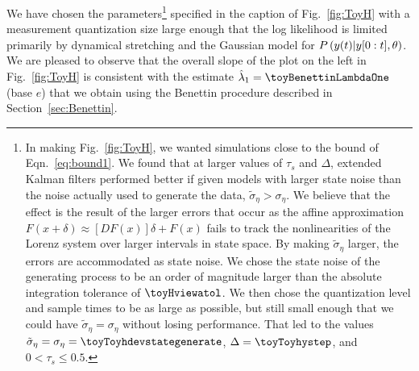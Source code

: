 We have chosen the parameters\footnote{ In making Fig.~\ref{fig:ToyH},
  we wanted simulations close to the bound of Eqn.~\eqref{eq:bound1}.
  We found that at larger values of $\tau_s$ and $\Delta$, extended
  Kalman filters performed better if given models with larger state
  noise than the noise actually used to generate the data, \ie
  $\tilde \sigma_\eta > \sigma_\eta$.  We believe that the effect is
  the result of the larger errors that occur as the affine
  approximation $F(x+\delta) \approx [DF(x)] \delta + F(x)$ fails to
  track the nonlinearities of the Lorenz system over larger intervals
  in state space.  By making $\tilde \sigma_\eta$ larger, the errors
  are accommodated as state noise.  We chose the state noise of the
  generating process to be an order of magnitude larger than the
  absolute integration tolerance of $\toyHviewatol$.  We then chose
  the quantization level and sample times to be as large as possible,
  but still small enough that we could have
  $\tilde \sigma_\eta = \sigma_\eta$ without losing performance.  That
  led to the values
  $\tilde \sigma_\eta = \sigma_\eta = \toyToyhdevstategenerate$,
  $\Delta = \toyToyhystep$, and $0 < \tau_s \leq 0.5$.} specified in
the caption of Fig.~\ref{fig:ToyH} with a measurement quantization
size large enough that the log likelihood is limited primarily by
dynamical stretching and the Gaussian model for
$ P \left({y}{(t)}|y[0:t], \theta \right)$.  We are pleased
to observe that the overall slope of the plot on the left in
Fig.~\ref{fig:ToyH} is consistent with the estimate
$\hat \lambda_1 = \toyBenettinLambdaOne$ (base $e$) that we obtain
using the Benettin procedure described in Section~\ref{sec:Benettin}.

